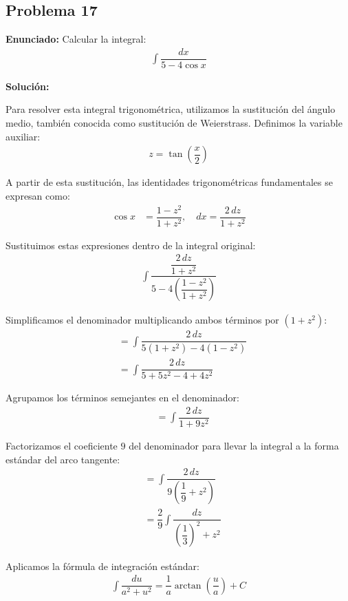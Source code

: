 \subsection*{Problema 17}

\textbf{Enunciado:} Calcular la integral:
\begin{align*}
\int \dfrac{dx}{5 - 4\cos x}
\end{align*}

\textbf{Solución:} 

Para resolver esta integral trigonométrica, 
utilizamos la sustitución del ángulo medio, 
también conocida como sustitución de Weierstrass. 
Definimos la variable auxiliar:
\begin{align*}
z = \tan\left(\dfrac{x}{2}\right)
\end{align*}

A partir de esta sustitución, 
las identidades trigonométricas 
fundamentales se expresan como:
\begin{align*}
\cos x &= \dfrac{1 - z^2}{1 + z^2}, \quad
dx = \dfrac{2\,dz}{1 + z^2}
\end{align*}

Sustituimos estas expresiones 
dentro de la integral original:
\begin{align*}
\int \dfrac{\dfrac{2\,dz}{1 + z^2}}
{5 - 4\left(\dfrac{1 - z^2}{1 + z^2}\right)}
\end{align*}

Simplificamos el denominador 
multiplicando ambos términos 
por $(1 + z^2)$:
\begin{align*}
&= \int \dfrac{2\,dz}
{5(1 + z^2) - 4(1 - z^2)} \\
&= \int \dfrac{2\,dz}
{5 + 5z^2 - 4 + 4z^2}
\end{align*}

Agrupamos los términos semejantes 
en el denominador:
\begin{align*}
&= \int \dfrac{2\,dz}{1 + 9z^2}
\end{align*}

Factorizamos el coeficiente $9$ 
del denominador para llevar la integral 
a la forma estándar del arco tangente:
\begin{align*}
&= \int \dfrac{2\,dz}
{9\left(\dfrac{1}{9} + z^2\right)} \\
&= \dfrac{2}{9} \int \dfrac{dz}
{\left(\dfrac{1}{3}\right)^2 + z^2}
\end{align*}

Aplicamos la fórmula de integración estándar:
\begin{align*}
\int \dfrac{du}{a^2 + u^2} 
= \dfrac{1}{a} \arctan\left(\dfrac{u}{a}\right) + C
\end{align*}

